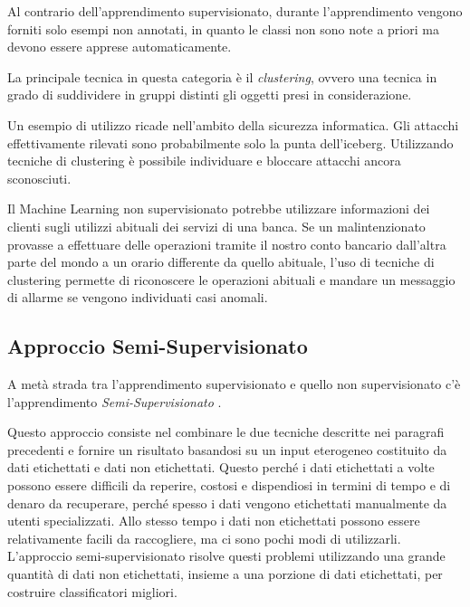 \documentclass[a4paper,12pt]{report}
\begin{document}

Al contrario dell'apprendimento supervisionato, durante l'apprendimento vengono forniti solo esempi non annotati, in quanto le classi non sono note a priori ma devono essere apprese automaticamente.

\bigskip

La principale tecnica in questa categoria è il \textit{clustering}, ovvero una tecnica in grado di suddividere in gruppi distinti  gli oggetti presi in considerazione.

Un esempio di utilizzo ricade nell'ambito della sicurezza informatica. Gli attacchi effettivamente rilevati sono probabilmente solo la punta dell'iceberg. Utilizzando tecniche di clustering è possibile individuare e bloccare attacchi ancora sconosciuti.

Il Machine Learning non supervisionato potrebbe utilizzare informazioni dei clienti sugli utilizzi abituali dei servizi di una banca. Se un malintenzionato provasse a effettuare delle operazioni tramite il nostro conto bancario dall'altra parte del mondo a un orario differente da quello abituale, l'uso di tecniche di clustering permette di riconoscere le operazioni abituali e mandare un messaggio di allarme se vengono individuati casi anomali.

\subsection*{Approccio Semi-Supervisionato}
A metà strada tra l'apprendimento supervisionato e quello non supervisionato c'è l'apprendimento \textit{Semi-Supervisionato} \cite{supervisedlearning}.

Questo approccio consiste nel combinare le due tecniche descritte nei paragrafi precedenti e fornire un risultato basandosi su un input eterogeneo costituito da dati etichettati e dati non etichettati.
Questo perché i dati etichettati a volte possono essere difficili da reperire, costosi e dispendiosi in termini di tempo e di denaro da recuperare, perché spesso i dati vengono etichettati manualmente da utenti specializzati. Allo stesso tempo i dati non etichettati possono essere relativamente facili da raccogliere, ma ci sono pochi modi di utilizzarli. 
L'approccio semi-supervisionato risolve questi problemi utilizzando una grande quantità di dati non etichettati, insieme a una porzione di dati etichettati, per costruire classificatori migliori. 
\end{document}
